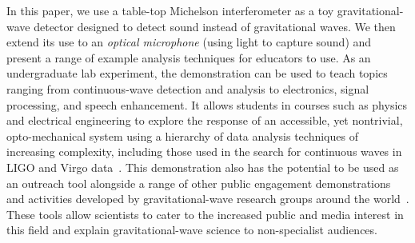 \documentclass[paper-main.tex]{subfiles}
\begin{document}
In this paper, we use a table-top Michelson interferometer as a toy gravitational-wave detector designed to detect sound instead of gravitational waves. 
We then extend its use to an \emph{optical microphone} (using light to capture sound) and present a range of example analysis techniques for educators to use. 
As an undergraduate lab experiment, the demonstration can be used to teach topics ranging from continuous-wave detection and analysis to electronics, signal processing, and speech enhancement. 
It allows students in courses such as physics and electrical engineering to explore the response of an accessible, yet nontrivial, opto-mechanical system using a hierarchy of data analysis techniques of increasing complexity, including those used in the search for continuous waves in LIGO and Virgo data~\cite{ScoX1O2Viterbi:2019, SuvorovaEtAl:2017,SuvorovaEtAl:2016}. 
This demonstration also has the potential to be used as an outreach tool alongside a range of other public engagement demonstrations and activities developed by gravitational-wave research groups around the world~\cite{TTExhibit:2020,CavagliaExhibit:2009, LIGOScienceEducationCentre:online, GravityDiscoveryCentre:online, GWOSC:online, LOSC:2015, LaserLabs:online, SciVR:online,chirp:online, BlackHoleHunter:online, ArthurJeffesMusic:online, GravitySynthLeonTrimble:online}. 
These tools allow scientists to cater to the increased public and media interest in this field and explain gravitational-wave science to non-specialist audiences.
\end{document}
